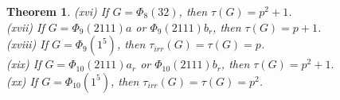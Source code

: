 \documentclass[a4paper,11pt]{amsart}
\numberwithin{equation}{section}
\numberwithin{equation}{subsection}
\newtheorem{theorem}{Theorem}[section]
\newcommand{\tg}{\tau(G)}
\newcommand{\ti}{\tau_{irr}(G)}
\begin{document}
\begin{theorem}

(xvi) If $G = \Phi_8(32)$, then $\tau(G)=p^2+1$. \\


(xvii) If $G= \Phi_{9}(2111)a$ or $\Phi_{9}(2111)b_r$, then $\tau(G) = p+1$. \\

(xviii) If $G = \Phi_{9}(1^5)$, then $\ti = \tg = p$. \\

(xix) If $G = \Phi_{10}(2111)a_r$ or $\Phi_{10}(2111)b_r$, then $\tg= p^2+1.$ \\ 

(xx) If $G = \Phi_{10}(1^5)$, then $\ti = \tg= p^2$.

\end{theorem}
\end{document}
